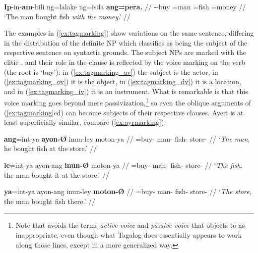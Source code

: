 \a\label{ex:tagmarking_iv}\begingl
	\gla \textbf{Ip}-in-\textbf{am}-bili ng=lalake ng=isda 
		\textbf{ang=pera.} //
	\glb \Iv{}-\Pfv{}-buy \Gen{}=man \Gen{}=fish \Nom{}=money //
	\glft `The man bought fish \emph{with the money}.' //
\endgl


\xe

The examples in (\ref{ex:tagmarking}) show variations on the same sentence,
differing in the distribution of the definite NP which \citet{kroeger1991}
classifies as being the subject of the respective sentence on syntactic
grounds. The subject NPs are marked with the clitic , and their role in
the clause is reflected by the voice marking on the verb (the root is 
`buy'): in (\ref{ex:tagmarking_av}) the subject is the actor, in
(\ref{ex:tagmarking_ov}) it is the object, in (\ref{ex:tagmarking_dv}) it is a
location, and in (\ref{ex:tagmarking_iv}) it is an instrument. What is
remarkable is that this voice marking goes beyond mere
passivization,\footnote{Note that \citet{kroeger1991} avoids the terms
\emph{active voice} and \emph{passive voice} that \citet{schachter2015} objects
to as inappropriate, even though what Tagalog does essentially appears to work
along those lines, except in a more generalized way.} so even the oblique
arguments of (\ref{ex:tagmarking}cd) can become subjects of their respective
clauses. Ayeri is at least superficially similar, compare
(\ref{ex:ayrmarking}).

\pex\label{ex:ayrmarking}
\a\label{ex:ayrmarking_at}\begingl
	\gla \textbf{ang}=int-ya \textbf{ayon-Ø} inun-ley moton-ya //
	\glb \AgtT{}=buy-\TsgM{} man-\Top{} fish-\PargI{} store-\Loc{} //
	\glft `\emph{The man}, he bought fish at the store.' //
\endgl

\a\label{ex:ayrmarking_pt}\begingl
	\gla \textbf{le}=int-ya ayon-ang \textbf{inun-Ø} moton-ya //
	\glb \PatTI{}=buy-\TsgM{} man-\Aarg{} fish-\Top{} store-\Loc{} //
	\glft `\emph{The fish}, the man bought it at the store.' //
\endgl

\a\label{ex:ayrmarking_loct}\begingl
	\gla \textbf{ya}=int-ya ayon-ang inun-ley \textbf{moton-Ø} //
	\glb \LocT{}=buy-\TsgM{} man-\Aarg{} fish-\PargI{} store-\Top{} //
	\glft `\emph{The store}, the man bought fish there.' //
\endgl

